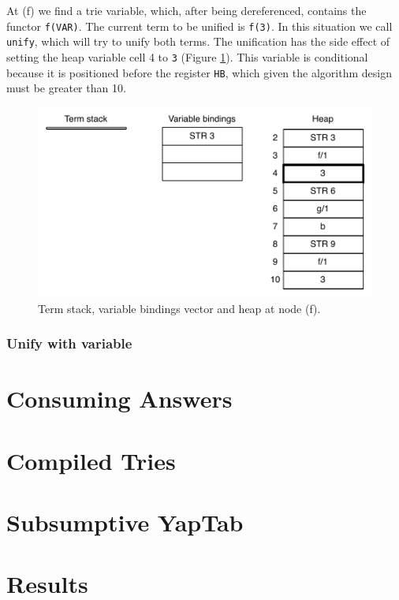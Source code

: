 At (f) we find a trie variable, which, after being dereferenced, contains the
functor \texttt{f(VAR)}. The current term to be unified is \texttt{f(3)}.
In this situation we call \texttt{unify}, which will try to unify both terms.
The unification has the side effect of setting the heap variable cell 4 to \texttt{3}
(Figure \ref{fig:collect_functor5}).
This variable is conditional because it is positioned before the register \texttt{HB},
which given the algorithm design must be greater than 10.

\begin{figure}[H]
  \centering
    \includegraphics[scale=0.6]{collect_functor5.pdf}
  \caption{Term stack, variable bindings vector and heap at node (f).}
  \label{fig:collect_functor5}
\end{figure}

\subsubsection{Unify with variable}

\section{Consuming Answers}

\section{Compiled Tries}

\section{Subsumptive YapTab}

\section{Results}

